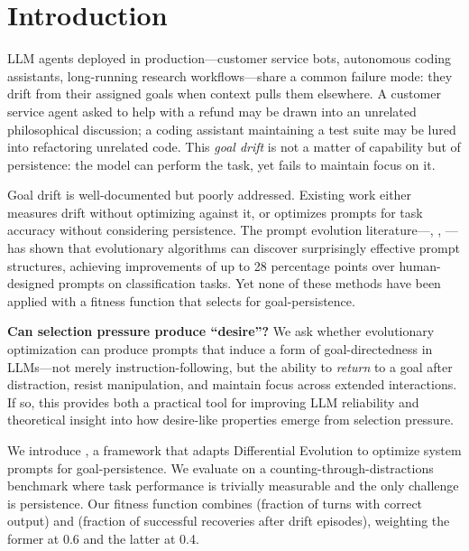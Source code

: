 \section{Introduction}
\label{sec:intro}

LLM agents deployed in production---customer service bots, autonomous coding assistants, long-running research workflows---share a common failure mode: they drift from their assigned goals when context pulls them elsewhere.
A customer service agent asked to help with a refund may be drawn into an unrelated philosophical discussion; a coding assistant maintaining a test suite may be lured into refactoring unrelated code.
This \emph{goal drift} is not a matter of capability but of persistence: the model can perform the task, yet fails to maintain focus on it.

Goal drift is well-documented \citep{arike2025goaldrift, abdelnabi2024tasktracker} but poorly addressed.
Existing work either measures drift without optimizing against it, or optimizes prompts for task accuracy without considering persistence.
The prompt evolution literature---\evoprompt \citep{guo2024evoprompt}, \promptbreeder \citep{fernando2024promptbreeder}, \opro \citep{yang2023opro}---has shown that evolutionary algorithms can discover surprisingly effective prompt structures, achieving improvements of up to 28 percentage points over human-designed prompts on classification tasks.
Yet none of these methods have been applied with a fitness function that selects for goal-persistence.

{\bf Can selection pressure produce ``desire''?} We ask whether evolutionary optimization can produce prompts that induce a form of goal-directedness in LLMs---not merely instruction-following, but the ability to \emph{return} to a goal after distraction, resist manipulation, and maintain focus across extended interactions. If so, this provides both a practical tool for improving LLM reliability and theoretical insight into how desire-like properties emerge from selection pressure.

We introduce \ours, a framework that adapts Differential Evolution \citep{guo2024evoprompt} to optimize system prompts for goal-persistence.
We evaluate on a counting-through-distractions benchmark where task performance is trivially measurable and the only challenge is persistence.
Our fitness function combines \persistence (fraction of turns with correct output) and \returnrate (fraction of successful recoveries after drift episodes), weighting the former at 0.6 and the latter at 0.4.


